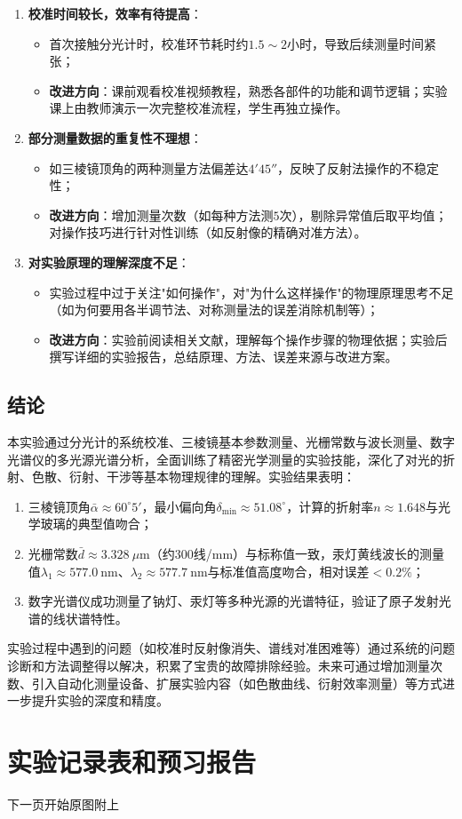 \documentclass[11pt]{article}
\begin{document}
\begin{enumerate}
    \item \textbf{校准时间较长，效率有待提高}：
    \begin{itemize}
        \item 首次接触分光计时，校准环节耗时约$1.5 \sim 2$小时，导致后续测量时间紧张；
        \item \textbf{改进方向}：课前观看校准视频教程，熟悉各部件的功能和调节逻辑；实验课上由教师演示一次完整校准流程，学生再独立操作。
    \end{itemize}
    
    \item \textbf{部分测量数据的重复性不理想}：
    \begin{itemize}
        \item 如三棱镜顶角的两种测量方法偏差达$4'45''$，反映了反射法操作的不稳定性；
        \item \textbf{改进方向}：增加测量次数（如每种方法测$5$次），剔除异常值后取平均值；对操作技巧进行针对性训练（如反射像的精确对准方法）。
    \end{itemize}
    
    \item \textbf{对实验原理的理解深度不足}：
    \begin{itemize}
        \item 实验过程中过于关注"如何操作"，对"为什么这样操作"的物理原理思考不足（如为何要用各半调节法、对称测量法的误差消除机制等）；
        \item \textbf{改进方向}：实验前阅读相关文献，理解每个操作步骤的物理依据；实验后撰写详细的实验报告，总结原理、方法、误差来源与改进方案。
    \end{itemize}
\end{enumerate}

\subsection{结论}

本实验通过分光计的系统校准、三棱镜基本参数测量、光栅常数与波长测量、数字光谱仪的多光源光谱分析，全面训练了精密光学测量的实验技能，深化了对光的折射、色散、衍射、干涉等基本物理规律的理解。实验结果表明：

\begin{enumerate}
    \item 三棱镜顶角$\bar{\alpha} \approx 60^\circ5'$，最小偏向角$\delta_{\text{min}} \approx 51.08^\circ$，计算的折射率$n \approx 1.648$与光学玻璃的典型值吻合；
    \item 光栅常数$\bar{d} \approx 3.328\ \mu\text{m}$（约300线/mm）与标称值一致，汞灯黄线波长的测量值$\lambda_1 \approx 577.0\ \text{nm}$、$\lambda_2 \approx 577.7\ \text{nm}$与标准值高度吻合，相对误差$< 0.2\%$；
    \item 数字光谱仪成功测量了钠灯、汞灯等多种光源的光谱特征，验证了原子发射光谱的线状谱特性。
\end{enumerate}

实验过程中遇到的问题（如校准时反射像消失、谱线对准困难等）通过系统的问题诊断和方法调整得以解决，积累了宝贵的故障排除经验。未来可通过增加测量次数、引入自动化测量设备、扩展实验内容（如色散曲线、衍射效率测量）等方式进一步提升实验的深度和精度。

\section{实验记录表和预习报告}
下一页开始原图附上

\end{document}
